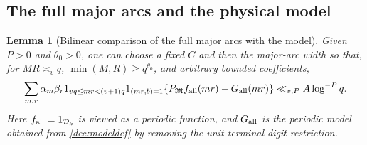 \documentclass[11pt,a4paper]{article}
\theoremstyle{paperplain}
\newtheorem{lemma}[theorem]{Lemma}
\numberwithin{equation}{section}
\begin{document}
\subsection{The full major arcs and the physical model}

\begin{lemma}[Bilinear comparison of the full major arcs with the model]\label{dec:bridge}
Given $P>0$ and $\theta_0>0$, one can choose a fixed $C$ and then
the major-arc width so that, for $MR\asymp_vq$,
$\min(M,R)\ge q^{\theta_0}$, and arbitrary bounded coefficients,
\begin{equation}\label{dec:bridgeeq}
 \sum_{m,r}\alpha_m\beta_r1_{vq\le mr<(v+1)q}1_{(mr,b)=1}
 \{P_{\mathfrak M}f_{\rm all}(mr)-G_{\rm all}(mr)\}
 \ll_{v,P}A\log^{-P}q.
\end{equation}
Here $f_{\rm all}=1_{\mathcal D_k}$ is viewed as a periodic function,
and $G_{\rm all}$ is the periodic model obtained from
\eqref{dec:modeldef} by removing the unit terminal-digit restriction.
\end{lemma}
\end{document}
